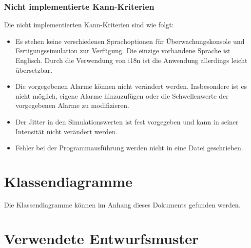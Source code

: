 \documentclass[parskip=full]{scrartcl}
\begin{document}
\subsubsection{Nicht implementierte Kann-Kriterien}
Die nicht implementierten Kann-Kriterien sind wie folgt:

\begin{itemize}
    \item Es stehen keine verschiedenen Sprachoptionen f\"ur \"Uberwachungskonsole und Fertigungssimulation zur Verf\"ugung.
    Die einzige vorhandene Sprache ist Englisch. Durch die Verwendung von i18n ist die Anwendung allerdings leicht übersetzbar.
    \item Die vorgegebenen Alarme k\"onnen nicht ver\"andert werden. Insbesondere ist es nicht m\"oglich, eigene Alarme hinzuzuf\"ugen
    oder die Schwellenwerte der vorgegebenen Alarme zu modifizieren.
    \item Der Jitter in den Simulationswerten ist fest vorgegeben und kann in seiner Intensit\"at nicht ver\"andert werden.
    \item Fehler bei der Programmausf\"uhrung werden nicht in eine Datei geschrieben.
\end{itemize}

\section{Klassendiagramme}
Die Klassendiagramme können im Anhang dieses Dokuments gefunden werden.

\section{Verwendete Entwurfsmuster}
\end{document}

